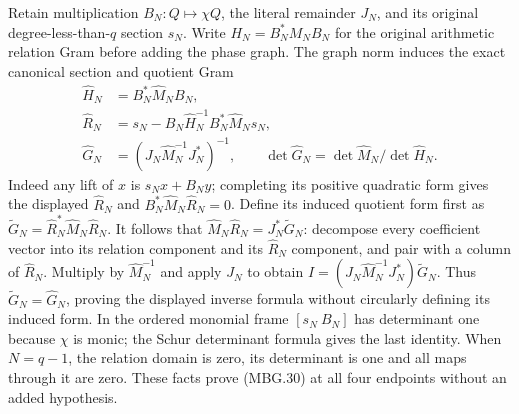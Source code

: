 Retain multiplication \(B_N:Q\mapsto\chi Q\), the literal remainder
\(J_N\), and its original degree-less-than-\(q\) section \(s_N\).
Write \(H_N=B_N^*M_NB_N\) for the original arithmetic relation
Gram before adding the phase graph.
The graph norm induces the exact canonical section and quotient Gram
\[
 \begin{split}
 \widehat H_N&=B_N^*\widehat M_NB_N,\\
 \widehat R_N&=s_N-B_N\widehat H_N^{-1}B_N^*\widehat M_Ns_N,\\
 \widehat G_N&=(J_N\widehat M_N^{-1}J_N^*)^{-1},\qquad
 \det\widehat G_N=\det\widehat M_N/\det\widehat H_N .
 \end{split}
 \tag{MBG.30}\label{eq:mbg-window-Schur}
\]
Indeed any lift of \(x\) is \(s_Nx+B_Ny\); completing its positive
quadratic form gives the displayed \(\widehat R_N\) and
\(B_N^*\widehat M_N\widehat R_N=0\).
Define its induced quotient form first as
\(\widetilde G_N=\widehat R_N^*\widehat M_N\widehat R_N\).
It follows that
\(\widehat M_N\widehat R_N=J_N^*\widetilde G_N\):
decompose every coefficient vector into its relation component and
its \(\widehat R_N\) component, and pair with a column of
\(\widehat R_N\). Multiply by \(\widehat M_N^{-1}\) and apply
\(J_N\) to obtain
\(I=(J_N\widehat M_N^{-1}J_N^*)\widetilde G_N\).
Thus \(\widetilde G_N=\widehat G_N\), proving the displayed inverse
formula without circularly defining its induced form.
In the ordered monomial frame \([s_N\ B_N]\) has determinant one
because \(\chi\) is monic; the Schur determinant formula gives the
last identity. When \(N=q-1\), the relation domain is zero, its
determinant is one and all maps through it are zero. These facts
prove (MBG.30) at all four endpoints without an added hypothesis.

